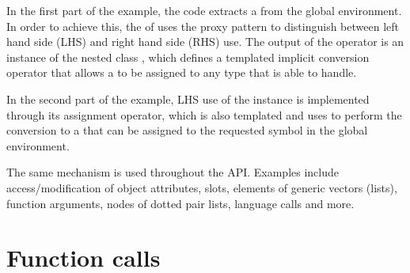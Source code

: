 In the first part of the example, the code extracts a 
 from the global environment. In order to achieve this, 
the   of  uses the proxy pattern 
\citep{meyers:moreeffectivecplusplus}
to distinguish between left hand side (LHS) and right hand side (RHS) use. 
%
The output of the operator is an instance of the nested class
, which defines a templated implicit conversion 
operator that allows a  to be assigned to any type that 
 is able to handle. 

In the second part of the example, LHS use of the  instance is 
implemented through its assignment operator, which is also templated and uses
 to perform the conversion to a  that can be 
assigned to the requested symbol in the global environment. 

The same mechanism is used throughout the API. Examples include access/modification
of object attributes, slots, elements of generic vectors (lists), 
function arguments, nodes of dotted pair lists, language calls and more. 

\section{Function calls}

